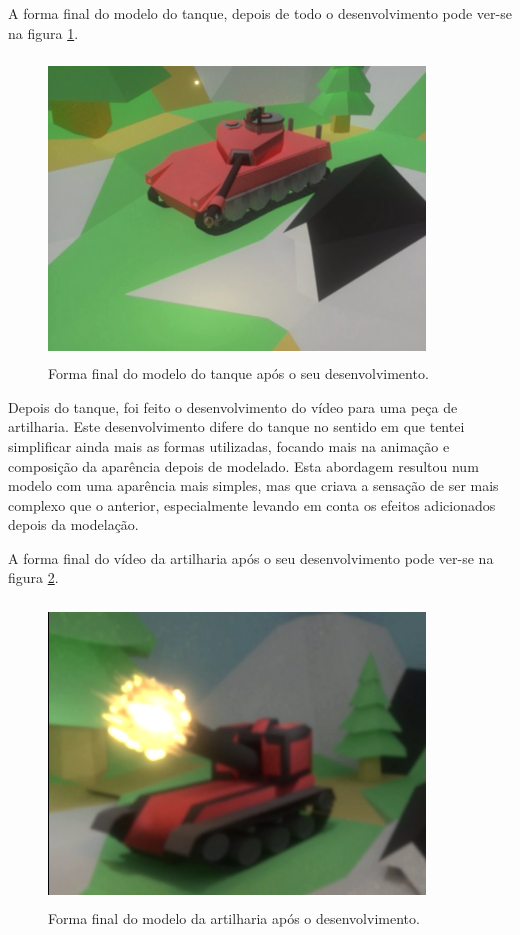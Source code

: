 A forma final do modelo do tanque, depois de todo o desenvolvimento pode ver-se na figura \ref{fig:fff1}.
\begin{figure}[!h]
  \includegraphics[width=10cm, height=8cm]{model4.png}
  \centering
  \caption{Forma final do modelo do tanque após o seu desenvolvimento.}
  \label{fig:fff1}
\end{figure}

Depois do tanque, foi feito o desenvolvimento do vídeo para uma peça de artilharia. Este desenvolvimento difere do tanque no sentido em que tentei simplificar ainda mais as formas utilizadas, focando mais na animação e composição da aparência depois de modelado. 
Esta abordagem resultou num modelo com uma aparência mais simples, mas que criava a sensação de ser mais complexo que o anterior, especialmente levando em conta os efeitos adicionados depois da modelação.

\clearpage
A forma final do vídeo da artilharia após o seu desenvolvimento pode ver-se na figura \ref{fig:artilharia2}.


\begin{figure}[!h]
 \centerline{\includegraphics[width=10cm, height=8cm]{model2.png}}
  \centering
  \caption{Forma final do modelo da artilharia após o desenvolvimento.}
  \label{fig:artilharia2}
\end{figure}


